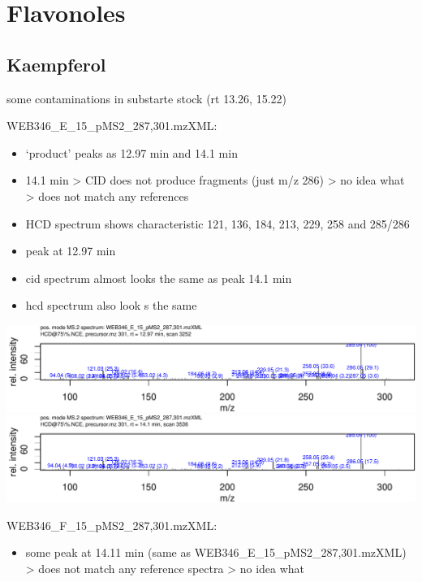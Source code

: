 \documentclass[]{article}
\begin{document}
\section{Flavonoles}\label{flavonoles}

\subsection{Kaempferol}\label{kaempferol}

some contaminations in substarte stock (rt 13.26, 15.22)

WEB346\_E\_15\_pMS2\_287,301.mzXML:

\begin{itemize}
\itemsep1pt\parskip0pt
\item
  `product' peaks as 12.97 min and 14.1 min
\item
  14.1 min \textgreater{} CID does not produce fragments (just m/z 286)
  \textgreater{} no idea what \textgreater{} does not match any
  references
\item
  HCD spectrum shows characteristic 121, 136, 184, 213, 229, 258 and
  285/286
\item
  peak at 12.97 min
\item
  cid spectrum almost looks the same as peak 14.1 min
\item
  hcd spectrum also look s the same
\end{itemize}

\includegraphics{flavones_products_files/figure-latex/kaempferol-1.pdf}
\includegraphics{flavones_products_files/figure-latex/kaempferol-2.pdf}

WEB346\_F\_15\_pMS2\_287,301.mzXML:

\begin{itemize}
\itemsep1pt\parskip0pt
\item
  some peak at 14.11 min (same as WEB346\_E\_15\_pMS2\_287,301.mzXML)
  \textgreater{} does not match any reference spectra \textgreater{} no
  idea what
\end{itemize}
\end{document}
